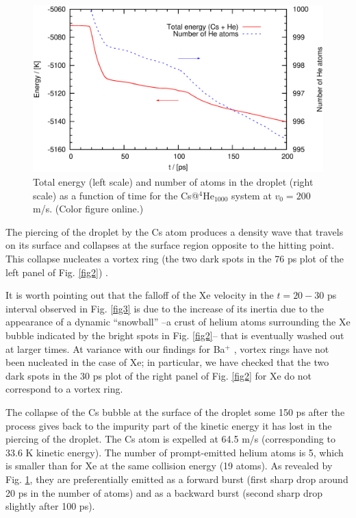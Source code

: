  
\begin{figure}[!]
\centerline{\includegraphics[width=0.90\linewidth,clip]{fig5}}
\caption{\label{fig5} 
Total energy  (left scale) and number of atoms in the droplet (right scale) as a function of time for the 
Cs@$^4$He$_{1000}$ system at $v_0 = 200$ m/s. (Color figure online.)
}
\end{figure}

 
 The piercing of the droplet by the Cs atom produces a density wave that travels on its surface and collapses at the surface region opposite to the hitting point.
 This collapse nucleates a 
 vortex ring (the two dark spots in the 76 ps plot of the left panel of Fig. \ref{fig2}) \cite{Lea14}.
 
 It is worth pointing out that the falloff of the Xe velocity in the $t=20-30$ ps interval observed in Fig. \ref{fig3}  is due to the increase of its inertia
due to the appearance of a dynamic ``snowball''  --a crust of helium atoms surrounding the Xe bubble indicated by the bright spots in 
Fig. \ref{fig2}-- that is eventually washed out at larger times.
At variance with our findings for Ba$^+$ \cite{Mat14}, vortex rings have not been nucleated in the case of Xe; in particular, we have checked that the two dark spots  in the 30 ps plot of the right panel of Fig. \ref{fig2} for Xe do not correspond to a vortex ring. 

The collapse of the Cs bubble at the surface of the droplet some 150 ps after the process 
 gives back to the impurity part of the kinetic energy it has lost  in the 
 piercing of the droplet. The Cs atom is expelled at 64.5 m/s (corresponding to 33.6 K kinetic energy). 
The number of prompt-emitted helium atoms is 5, which is smaller than for Xe at the same collision energy (19 atoms).
As revealed by Fig. \ref{fig5}, they are  preferentially emitted as a forward  burst  (first sharp drop around 20 ps in the number of atoms) and as a 
backward burst  (second sharp drop slightly after 100 ps).
 
